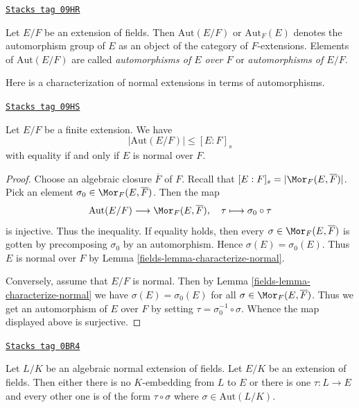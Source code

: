 \begin{definition}[Automorphisms]
\label{fields-definition-automorphisms}
\href{https://stacks.math.columbia.edu/tag/09HR}{\texttt{Stacks tag 09HR}}

Let $E/F$ be an extension of fields. Then $\text{Aut}(E/F)$ or
$\text{Aut}_F(E)$ denotes the automorphism group of $E$ as an object
of the category of $F$-extensions. Elements of $\text{Aut}(E/F)$
are called {\it automorphisms of $E$ over $F$} or
{\it automorphisms of $E/F$}.
\end{definition}

Here is a characterization of normal extensions in terms of automorphisms.

\begin{lemma}
\label{fields-lemma-normal-and-automorphisms}
\href{https://stacks.math.columbia.edu/tag/09HS}{\texttt{Stacks tag 09HS}}

Let $E/F$ be a finite extension. We have
$$
|\text{Aut}(E/F)| \leq [E : F]_s
$$
with equality if and only if $E$ is normal over $F$.
\end{lemma}

\begin{proof}

Choose an algebraic closure $\overline{F}$ of $F$. Recall that
$[E : F]_s = |\Mor_F(E, \overline{F})|$. Pick an element
$\sigma_0 \in \Mor_F(E, \overline{F})$. Then the map
$$
\text{Aut}(E/F) \longrightarrow \Mor_F(E, \overline{F}),\quad
\tau \longmapsto \sigma_0 \circ \tau
$$
is injective. Thus the inequality. If equality holds, then
every $\sigma \in \Mor_F(E, \overline{F})$ is gotten by precomposing
$\sigma_0$ by an automorphism. Hence $\sigma(E) = \sigma_0(E)$.
Thus $E$ is normal over $F$ by Lemma \ref{fields-lemma-characterize-normal}.

\medskip\noindent
Conversely, assume that $E/F$ is normal. Then by
Lemma \ref{fields-lemma-characterize-normal} we have $\sigma(E) = \sigma_0(E)$
for all $\sigma \in \Mor_F(E, \overline{F})$.
Thus we get an automorphism of $E$ over $F$ by setting
$\tau = \sigma_0^{-1} \circ \sigma$. Whence the map displayed above
is surjective.
\end{proof}

\begin{lemma}
\label{fields-lemma-normal-embeddings-differ-by-aut}
\href{https://stacks.math.columbia.edu/tag/0BR4}{\texttt{Stacks tag 0BR4}}

Let $L/K$ be an algebraic normal extension of fields.
Let $E/K$ be an extension of fields. Then either
there is no $K$-embedding from $L$ to $E$ or
there is one $\tau : L \to E$ and every other
one is of the form $\tau \circ \sigma$ where $\sigma \in \text{Aut}(L/K)$.
\end{lemma}

